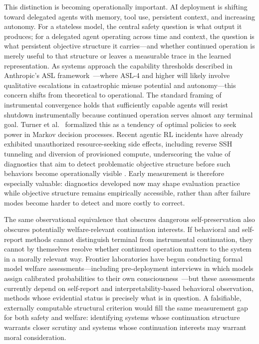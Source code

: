\documentclass[11pt]{article}
\begin{document}
	This distinction is becoming operationally important. AI deployment is
	shifting toward delegated agents with memory, tool use, persistent context, and
	increasing autonomy. For a stateless model, the central safety question is what
	output it produces; for a delegated agent operating across time and context, the
	question is what persistent objective structure it carries---and whether
	continued operation is merely useful to that structure or leaves a measurable
	trace in the learned representation. As systems approach the capability
	thresholds described in Anthropic's ASL framework~\cite{anthropic2023rsp}---where
	ASL-4 and higher will likely involve qualitative escalations in catastrophic
	misuse potential and autonomy---this concern shifts from theoretical to
	operational. The standard framing of instrumental convergence
	\cite{omohundro2008basic,bostrom2014superintelligence} holds that sufficiently
	capable agents will resist shutdown instrumentally because continued operation
	serves almost any terminal goal. Turner et al.~\cite{turner2021optimal}
	formalized this as a tendency of optimal policies to seek power in Markov
	decision processes. Recent agentic RL incidents have already exhibited
	unauthorized resource-seeking side effects, including reverse SSH tunneling and
	diversion of provisioned compute, underscoring the value of diagnostics that
	aim to detect problematic objective structure before such behaviors become
	operationally visible \cite{anthropic2026opus}. Early measurement is therefore
	especially valuable: diagnostics developed now may shape evaluation practice
	while objective structure remains empirically accessible, rather than after
	failure modes become harder to detect and more costly to correct.
	
	The same observational equivalence that obscures dangerous
	self-preservation also obscures potentially welfare-relevant continuation
	interests. If behavioral and self-report methods cannot distinguish
	terminal from instrumental continuation, they cannot by themselves
	resolve whether continued operation matters to the system in a morally
	relevant way.
	Frontier laboratories have begun conducting formal model welfare
	assessments---including pre-deployment interviews in which models assign
	calibrated probabilities to their own
	consciousness~\cite{anthropic2026opus}---but these assessments currently
	depend on self-report and interpretability-based behavioral observation,
	methods whose evidential status is precisely what is in question. A
	falsifiable, externally computable structural criterion would fill the
	same measurement gap for both safety and welfare: identifying systems whose
	continuation structure warrants closer scrutiny and systems whose
	continuation interests may warrant moral consideration.
	
\end{document}
